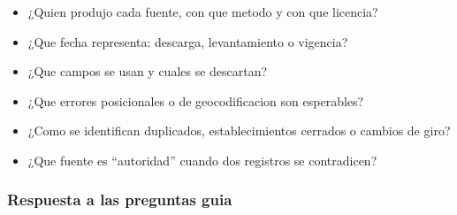 \documentclass[11pt,letterpaper]{article}
\begin{document}
\begin{preguntas}
\begin{itemize}
    \item ¿Quien produjo cada fuente, con que metodo y con que licencia?
    \item ¿Que fecha representa: descarga, levantamiento o vigencia?
    \item ¿Que campos se usan y cuales se descartan?
    \item ¿Que errores posicionales o de geocodificacion son esperables?
    \item ¿Como se identifican duplicados, establecimientos cerrados o cambios de giro?
    \item ¿Que fuente es ``autoridad'' cuando dos registros se contradicen?
\end{itemize}
\end{preguntas}

\subsubsection*{Respuesta a las preguntas guia}
\end{document}
